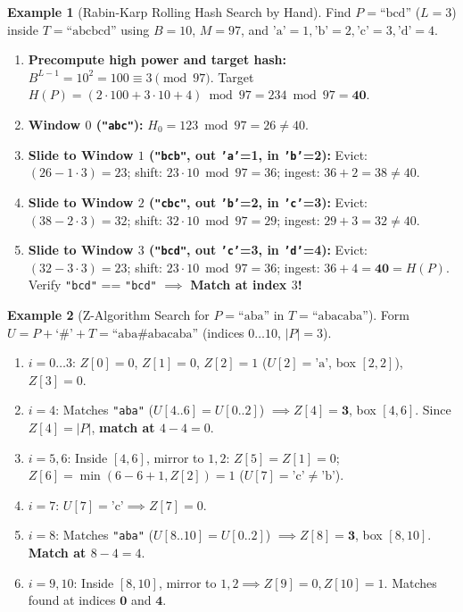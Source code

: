 \documentclass[11pt,a4paper]{article}
\theoremstyle{definition}
\newtheorem{example}{Example}[section]
\begin{document}
\begin{example}[Rabin-Karp Rolling Hash Search by Hand]
Find $P = \text{``bcd''}$ ($L = 3$) inside $T = \text{``abcbcd''}$ using $B = 10$, $M = 97$, and $\text{'a'}=1, \text{'b'}=2, \text{'c'}=3, \text{'d'}=4$.
\begin{enumerate}
    \item \textbf{Precompute high power and target hash:} $B^{L - 1} = 10^2 = 100 \equiv 3 \pmod{97}$. Target $H(P) = (2 \cdot 100 + 3 \cdot 10 + 4) \bmod 97 = 234 \bmod 97 = \mathbf{40}$.
    \item \textbf{Window $0$ (\texttt{"abc"}):} $H_0 = 123 \bmod 97 = 26 \neq 40$.
    \item \textbf{Slide to Window $1$ (\texttt{"bcb"}, out \texttt{'a'}=1, in \texttt{'b'}=2):} Evict: $(26 - 1 \cdot 3) = 23$; shift: $23 \cdot 10 \bmod 97 = 36$; ingest: $36 + 2 = 38 \neq 40$.
    \item \textbf{Slide to Window $2$ (\texttt{"cbc"}, out \texttt{'b'}=2, in \texttt{'c'}=3):} Evict: $(38 - 2 \cdot 3) = 32$; shift: $32 \cdot 10 \bmod 97 = 29$; ingest: $29 + 3 = 32 \neq 40$.
    \item \textbf{Slide to Window $3$ (\texttt{"bcd"}, out \texttt{'c'}=3, in \texttt{'d'}=4):} Evict: $(32 - 3 \cdot 3) = 23$; shift: $23 \cdot 10 \bmod 97 = 36$; ingest: $36 + 4 = \mathbf{40} = H(P)$. Verify \texttt{"bcd"} == \texttt{"bcd"} $\implies$ \textbf{Match at index $3$!}
\end{enumerate}
\end{example}

\begin{example}[Z-Algorithm Search for $P = \text{``aba''}$ in $T = \text{``abacaba''}$]
Form $U = P + \text{`\#'} + T = \text{``aba\#abacaba''}$ (indices $0 \dots 10$, $|P| = 3$).
\begin{enumerate}
    \item $i = 0 \dots 3$: $Z[0] = 0$, $Z[1] = 0$, $Z[2] = 1$ ($U[2]=\text{'a'}$, box $[2, 2]$), $Z[3] = 0$.
    \item $i = 4$: Matches \texttt{"aba"} ($U[4..6] = U[0..2]$) $\implies Z[4] = \mathbf{3}$, box $[4, 6]$. Since $Z[4] = |P|$, \textbf{match at $4 - 4 = 0$}.
    \item $i = 5, 6$: Inside $[4, 6]$, mirror to $1, 2$: $Z[5] = Z[1] = 0$; $Z[6] = \min(6 - 6 + 1, Z[2]) = 1$ ($U[7]=\text{'c'} \neq \text{'b'}$).
    \item $i = 7$: $U[7] = \text{'c'} \implies Z[7] = 0$.
    \item $i = 8$: Matches \texttt{"aba"} ($U[8..10] = U[0..2]$) $\implies Z[8] = \mathbf{3}$, box $[8, 10]$. \textbf{Match at $8 - 4 = 4$}.
    \item $i = 9, 10$: Inside $[8, 10]$, mirror to $1, 2 \implies Z[9] = 0, Z[10] = 1$. Matches found at indices $\mathbf{0}$ and $\mathbf{4}$.
\end{enumerate}
\end{example}
\end{document}
